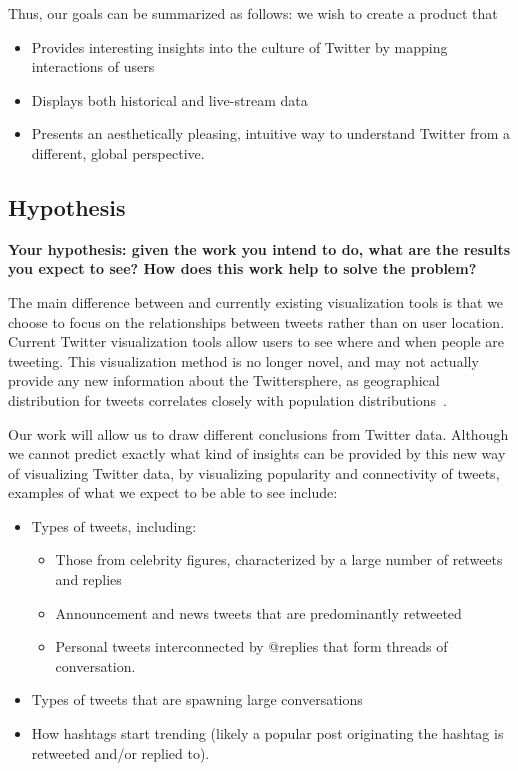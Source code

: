 Thus, our goals can be summarized as follows: we wish to create a product that
\begin{itemize}[noitemsep]
\item Provides interesting insights into the culture of Twitter by mapping interactions of users
\item Displays both historical and live-stream data
\item Presents an aesthetically pleasing, intuitive way to understand Twitter from a different, global perspective.
\end{itemize}

\subsection{Hypothesis} \label{sec:hypothesis}
\textbf{Your hypothesis: given the work you intend to do, what are the results you expect to see? How does this work help to solve the problem?}

The main difference between \sys and currently existing visualization tools is that we choose
to focus on the relationships between tweets rather than on user location. Current Twitter visualization tools
allow users to see where and when people are tweeting. This visualization method is no longer novel, and may not actually provide
any new information about the Twittersphere, as geographical distribution for tweets correlates closely with population 
distributions~\cite{xkcd-heatmap}. 

Our work will allow us to draw different conclusions from Twitter
data. Although we cannot predict exactly what kind of insights can be provided by this new way of visualizing Twitter data,
by visualizing popularity and connectivity of tweets, examples of what we expect to be able to see include:
\begin{itemize}[noitemsep]
\item Types of tweets, including:
\begin{itemize}[noitemsep, nolistsep]
\item Those from celebrity figures, characterized by a large number of retweets and replies
\item Announcement and news tweets that are predominantly retweeted
\item Personal tweets interconnected by @replies that form threads of conversation.
\end{itemize}
\item Types of tweets that are spawning large conversations
\item How hashtags start trending (likely a popular post originating the hashtag is retweeted and/or replied to). 
\end{itemize}

